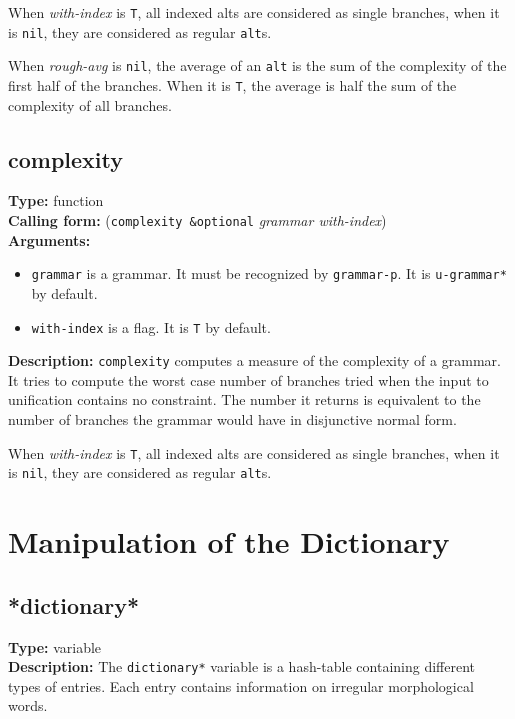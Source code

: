\documentclass[10pt,a4paper]{report}
\begin{document}
When {\em with-index} is {\tt T}, all indexed alts are considered as
single branches, when it is {\tt nil}, they are considered as regular
{\tt alt}s.

When {\em rough-avg} is {\tt nil}, the average of an {\tt alt} is the
sum of the complexity of the first half of the branches. When it
is {\tt T}, the average is half the sum of the complexity of all
branches.


\subsection{complexity}
{\bf Type:} function
\\{\bf Calling form:} ({\tt complexity \&optional} {\em grammar with-index})
\\{\bf Arguments:}
\begin{itemize}
\item {\tt grammar} is a grammar. It must be recognized by {\tt grammar-p}.
It is {\tt *u-grammar*} by default.

\item {\tt with-index} is a flag. It is {\tt T} by default.
\end{itemize}
{\bf Description:} {\tt complexity} computes a measure of the
complexity of a grammar. It tries to compute the worst case
number of branches tried when the input to unification contains
no constraint. The number it returns is equivalent to the number
of branches the grammar would have in disjunctive normal form.

When {\em with-index} is {\tt T}, all indexed alts are considered as
single branches, when it is {\tt nil}, they are considered as regular
{\tt alt}s.




\section{Manipulation of the Dictionary}

\subsection{*dictionary*}
{\bf Type:} variable
\\{\bf Description:} The {\tt *dictionary*} variable is a hash-table
containing different types of entries. Each entry contains
information on irregular morphological words.
\end{document}
